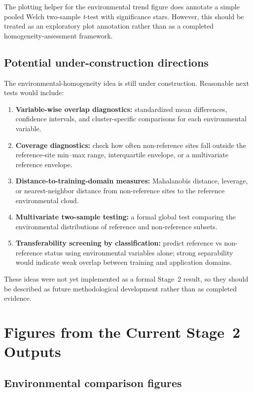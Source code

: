 \documentclass[11pt]{article}
\begin{document}
The plotting helper for the environmental trend figure does annotate a simple pooled Welch two-sample \textit{t}-test with significance stars. However, this should be treated as an exploratory plot annotation rather than as a completed homogeneity-assessment framework.

\subsection{Potential under-construction directions}

The environmental-homogeneity idea is still under construction. Reasonable next tests would include:
\begin{enumerate}[leftmargin=*]
  \item \textbf{Variable-wise overlap diagnostics:} standardized mean differences, confidence intervals, and cluster-specific comparisons for each environmental variable.
  \item \textbf{Coverage diagnostics:} check how often non-reference sites fall outside the reference-site min--max range, interquartile envelope, or a multivariate reference envelope.
  \item \textbf{Distance-to-training-domain measures:} Mahalanobis distance, leverage, or nearest-neighbor distance from non-reference sites to the reference environmental cloud.
  \item \textbf{Multivariate two-sample testing:} a formal global test comparing the environmental distributions of reference and non-reference subsets.
  \item \textbf{Transferability screening by classification:} predict reference vs non-reference status using environmental variables alone; strong separability would indicate weak overlap between training and application domains.
\end{enumerate}

These ideas were not yet implemented as a formal Stage~2 result, so they should be described as future methodological development rather than as completed evidence.

\section{Figures from the Current Stage~2 Outputs}

\subsection{Environmental comparison figures}
\end{document}
